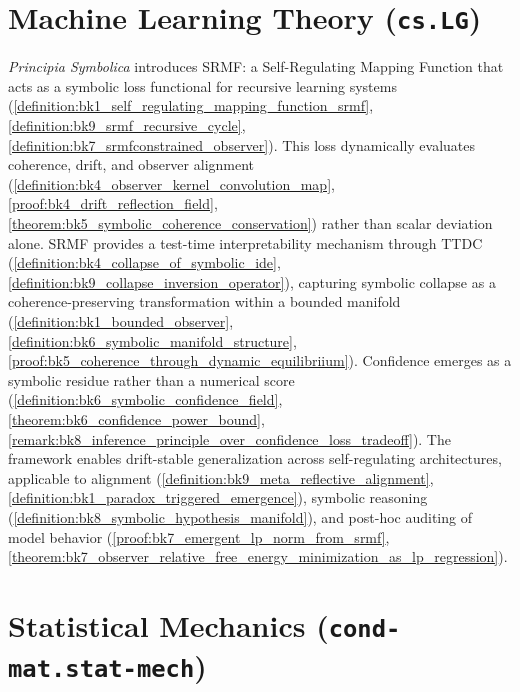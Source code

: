 \section*{Machine Learning Theory (\texttt{cs.LG})}
\label{abs:ml}

\emph{Principia Symbolica} introduces SRMF: a Self-Regulating Mapping Function that acts as a symbolic loss functional for recursive learning systems (\ref{definition:bk1_self_regulating_mapping_function_srmf}, \ref{definition:bk9_srmf_recursive_cycle}, \ref{definition:bk7_srmfconstrained_observer}). This loss dynamically evaluates coherence, drift, and observer alignment (\ref{definition:bk4_observer_kernel_convolution_map}, \ref{proof:bk4_drift_reflection_field}, \ref{theorem:bk5_symbolic_coherence_conservation}) rather than scalar deviation alone. SRMF provides a test-time interpretability mechanism through TTDC (\ref{definition:bk4_collapse_of_symbolic_ide}, \ref{definition:bk9_collapse_inversion_operator}), capturing symbolic collapse as a coherence-preserving transformation within a bounded manifold (\ref{definition:bk1_bounded_observer}, \ref{definition:bk6_symbolic_manifold_structure}, \ref{proof:bk5_coherence_through_dynamic_equilibriium}). Confidence emerges as a symbolic residue rather than a numerical score (\ref{definition:bk6_symbolic_confidence_field}, \ref{theorem:bk6_confidence_power_bound}, \ref{remark:bk8_inference_principle_over_confidence_loss_tradeoff}). The framework enables drift-stable generalization across self-regulating architectures, applicable to alignment (\ref{definition:bk9_meta_reflective_alignment}, \ref{definition:bk1_paradox_triggered_emergence}), symbolic reasoning (\ref{definition:bk8_symbolic_hypothesis_manifold}), and post-hoc auditing of model behavior (\ref{proof:bk7_emergent_lp_norm_from_srmf}, \ref{theorem:bk7_observer_relative_free_energy_minimization_as_lp_regression}).

\section*{Statistical Mechanics (\texttt{cond-mat.stat-mech})}
\label{abs:thermo}

